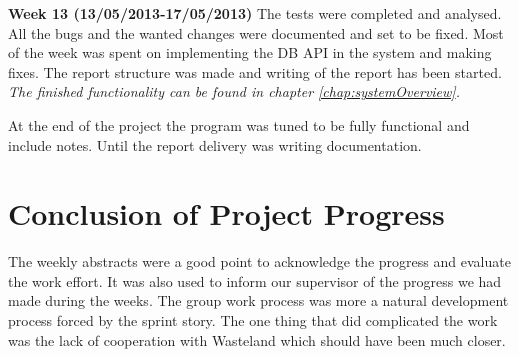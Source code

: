 \textbf{Week 13 (13/05/2013-17/05/2013)}
The tests were completed and analysed. 
All the bugs and the wanted changes were documented and set to be fixed.
Most of the week was spent on implementing the DB API in the system and making fixes.     
The report structure was made and writing of the report has been started. 
\textit{The finished functionality can be found in chapter \vref{chap:systemOverview}.}
 
At the end of the project the program was tuned to be fully functional and include notes.
Until the report delivery was writing documentation.       

\section{Conclusion of Project Progress}
The weekly abstracts were a good point to acknowledge the progress and evaluate the work effort. It was also used to inform our supervisor of the progress we had made during the weeks. 
The group work process was more a natural development process forced by the sprint story.       
The one thing that did complicated the work was the lack of cooperation with Wasteland which should have been much closer. 
\label{sec:conclusionofProjectProgress}
